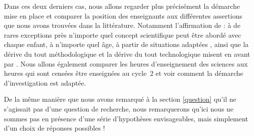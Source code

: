 Dans ces deux derniers cas, nous allons regarder plus précisément la démarche mise en place et comparer la position des enseignants aux différentes assertions que nous avons trouvées dans la littérature. Notamment l’affirmation de  : \og à de rares exceptions près n’importe quel concept scientifique peut être abordé avec chaque enfant, à n’importe quel âge, à partir de situations adaptées \fg{}, ainsi que la dérive du \og tout méthodologique \fg{} et la dérive du \og tout technologique \fg{} misent en avant par . Nous allons également comparer les heures d’enseignement des sciences aux heures qui sont censées être enseignées au cycle~2 et voir comment la démarche d’investigation est adaptée.

De la même manière que nous avons remarqué à la section \ref{question} qu’il ne s’agissait pas d’une question de recherche, nous remarquerons qu’ici nous ne sommes pas en présence d’une série d’hypothèses envisageables, mais simplement d’un choix de réponses possibles !